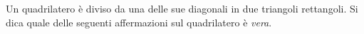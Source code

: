 Un quadrilatero è diviso da una delle sue diagonali in due 
triangoli rettangoli. Si dica quale delle seguenti affermazioni
sul quadrilatero è \emph{vera}.